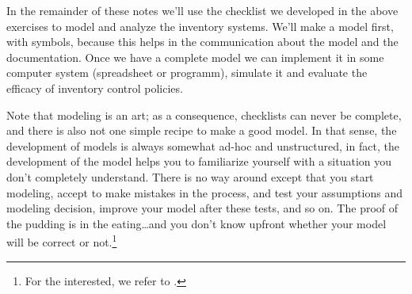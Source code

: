 
In the remainder of these notes we'll use the checklist we developed in the above exercises to model and analyze the inventory systems. We'll make a model first, with symbols, because this helps in the communication about the model and the documentation. Once we have a complete model we can
implement  it in some computer system (spreadsheet or programm), simulate it and evaluate
the efficacy of inventory control policies.  

Note that modeling is an art; as a consequence, checklists can never be
complete, and there is also not one simple recipe to make a good
model. In that sense, the development of models is always somewhat
ad-hoc and unstructured, in fact, the development of the model helps
you to familiarize yourself with a situation you don't completely
understand. There is no way around except that you start modeling,
accept to make mistakes in the process, and test your assumptions and
modeling decision, improve your model after these tests, and so on. The
proof of the pudding is in the eating\ldots and you don't know upfront
whether your model will be correct or not.\footnote{For the interested, we refer to \cite[Section 2.1, 2.2, 6.3 and 16.2.]{hopp08:_factor_physic}.}




\clearpage
